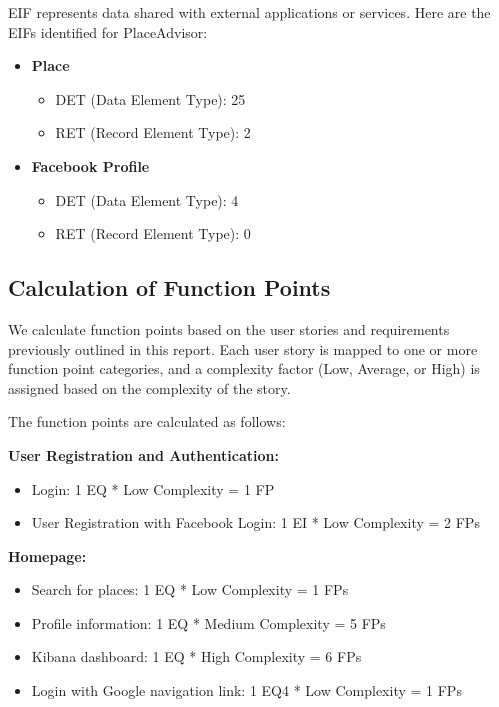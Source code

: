 \documentclass[../main.tex]{subfiles}
\begin{document}
EIF represents data shared with external applications or services. Here are the EIFs identified for PlaceAdvisor:

\begin{itemize}
  \item \textbf{Place}
    \begin{itemize}
      \item DET (Data Element Type): 25
      \item RET (Record Element Type): 2
    \end{itemize}

  \item \textbf{Facebook Profile}
    \begin{itemize}
      \item DET (Data Element Type): 4
      \item RET (Record Element Type): 0
    \end{itemize}
\end{itemize}


\subsection{Calculation of Function Points}

We calculate function points based on the user stories and requirements previously outlined in this report. Each user story is mapped to one or more function point categories, and a complexity factor (Low, Average, or High) is assigned based on the complexity of the story.

The function points are calculated as follows:

\textbf{User Registration and Authentication:}
\begin{itemize}
  \item Login: 1 EQ * Low Complexity = 1 FP
  \item User Registration with Facebook Login: 1 EI * Low Complexity = 2 FPs
\end{itemize}

\textbf{Homepage:}
\begin{itemize}
  \item Search for places: 1 EQ * Low Complexity = 1 FPs
  \item Profile information: 1 EQ * Medium Complexity = 5 FPs
  \item Kibana dashboard: 1 EQ * High Complexity = 6 FPs
  \item Login with Google navigation link: 1 EQ4 * Low Complexity = 1 FPs
\end{itemize}
\end{document}
